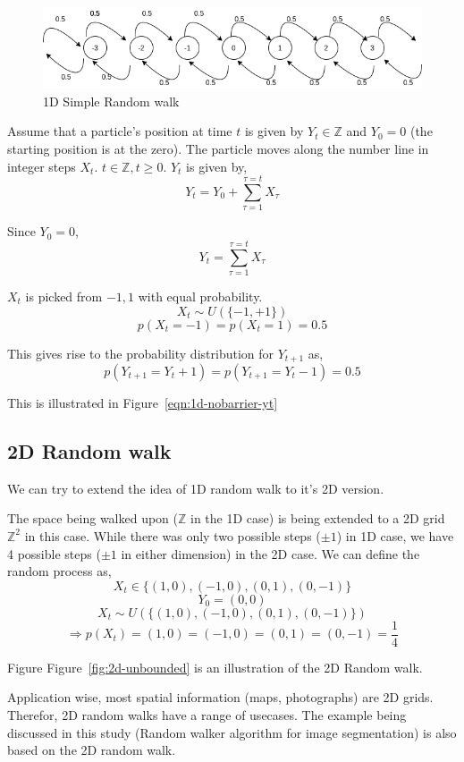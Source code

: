 \documentclass[a4paper]{article}
\newcommand\figref{Figure~\ref}
\begin{document}
\begin{figure}[h]
    \centering
    \includegraphics[width=\textwidth]{1d-unbounded.png}
    \caption{1D Simple Random walk}
    \label{fig:1d-unbounded}
\end{figure}

Assume that a particle's position at time $t$ is given by $Y_t \in \mathbb{Z}$ and $Y_0 = 0$ (the starting position is at the zero). The particle moves along the number line in integer steps $X_t$. $t \in \mathbb{Z}, t\geq0$.
$Y_t$ is given by,
$$Y_t = Y_0 + \sum_{\tau=1}^{\tau=t}X_{\tau}$$

Since $Y_0 = 0$,
$$Y_t = \sum_{\tau=1}^{\tau=t}X_{\tau}$$

$X_t$ is picked from ${-1,1}$ with equal probability.
$$X_t \sim
 \textit{U}(\{-1,+1\})$$
$$p(X_t=-1) = p(X_t=1) = 0.5$$

This gives rise to the probability distribution for $Y_{t+1}$ as,
\begin{equation}
    p(Y_{t+1}=Y_t+1)=p(Y_{t+1}=Y_t-1)=0.5
    \label{eqn:1d-nobarrier-yt}
\end{equation}

This is illustrated in \figref{eqn:1d-nobarrier-yt}
 

\subsection{2D Random walk}
We can try to extend the idea of 1D random walk to it's 2D version.

The space being walked upon ($\mathbb{Z}$ in the 1D case) is being extended to a 2D grid $\mathbb{Z}^2$ in this case. While there was only two possible steps ($\pm 1$) in 1D case, we have 4 possible steps ($\pm1$ in either dimension) in the 2D case. We can define the random process as,
$$X_t \in \{(1,0), (-1,0), (0,1), (0,-1)\}$$
$$Y_0 = (0,0)$$
$$X_t \sim
 \textit{U}(\{(1,0), (-1,0), (0,1), (0,-1)\})$$
 $$\Rightarrow p(X_t)= (1,0) =  (-1,0) = (0,1) = (0,-1) = \frac{1}{4}$$

Figure \figref{fig:2d-unbounded} is an illustration of the 2D Random walk.

Application wise, most spatial information (maps, photographs) are 2D grids. Therefor, 2D random walks have a range of usecases. The example being discussed in this study (Random walker algorithm
for image segmentation) is also based on the 2D random walk. 
\end{document}
